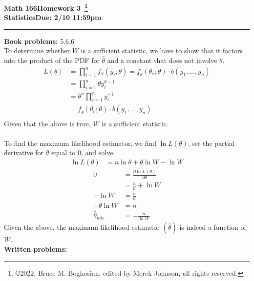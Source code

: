 \documentclass [12pt] {article}
\newcommand{\class}{Math 166}
\newcommand{\classname}{Statistics}
\newcommand{\assignment}{Homework 3}
\newcommand{\duedate}{Due: 2/10 11:59pm}
\begin{document}
\thispagestyle{empty}

\noindent \textbf{\class \hfill \assignment~\footnote{\copyright 2022, Bruce M. Boghosian, edited by Merek Johnson, all rights reserved.}}\\
\textbf{\classname \hfill \duedate} \\
\rule[1ex]{\textwidth}{.1pt}

\noindent \textbf{Book problems:}  5.6.6 \\
To determine whether $W$ is a sufficient statistic, we have to show that it factors into the product of the PDF for $\hat{\theta}$ and a constant that does not involve $\theta$.
\begin{align*}
L\left(\theta \right) 
&=\prod_{i=1}^{n}f_Y\left(y_i;\theta \right) = f_{\hat{\theta}}\left(\theta_e;\theta \right)\cdot b\left(y_1,...,y_n\right)\\
&=\prod_{i=1}^{n}\theta y_i^{\theta-1}\\
&=\theta^n\prod_{i=1}^{n}y_i^{-1} \\
&= f_{\hat{\theta}}\left(\theta_e;\theta \right)\cdot b\left(y_1,...,y_n\right)\\
\end{align*}
Given that the above is true, $W$ is a sufficient statistic.\\
\\
To find the maximum likelihood estimator, we find $\ln L(\theta)$, set the partial derivative for $\theta$ equal to 0, and solve.
\begin{align*}
\ln L\left(\theta \right)
&= n\ln\theta + \theta\ln W - \ln W 
\end{align*}
\begin{align*}
0
&=\frac{\partial \ln L\left(\theta\right)}{\partial \theta}\\
&=\frac{n}{\theta} + \ln W\\
-\ln W
&= \frac{n}{\theta}\\
-\theta\ln W
&= n\\
\hat{\theta}_{mle}
&= -\frac{n}{\ln W}
\end{align*}
Given the above, the maximum likelihood estimator $(\hat{\theta})$ is indeed a function of $W$.\\

\noindent \textbf{Written problems:}\\
\end{document}
